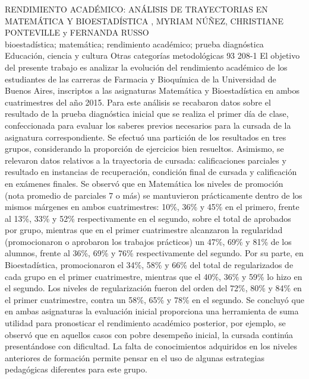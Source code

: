 \A
{RENDIMIENTO ACADÉMICO: ANÁLISIS DE TRAYECTORIAS EN MATEMÁTICA Y BIOESTADÍSTICA}
{, MYRIAM NÚÑEZ, CHRISTIANE PONTEVILLE y FERNANDA RUSSO}
{
\\}
{bioestadística; matemática; rendimiento académico; prueba diagnóstica} 
 {Educación, ciencia y cultura} 
 {Otras categorías metodológicas} 
 {93} 
 {208-1}
{El objetivo del presente trabajo es analizar la evolución del rendimiento académico de los estudiantes de las carreras de Farmacia y Bioquímica de la Universidad de Buenos Aires, inscriptos a las asignaturas Matemática y Bioestadística en ambos cuatrimestres del año 2015. Para este análisis se recabaron datos sobre el resultado de la prueba diagnóstica inicial que se realiza el primer día de clase, confeccionada para evaluar los saberes previos necesarios para la cursada de la asignatura correspondiente. Se efectuó una partición de los resultados en tres grupos, considerando la proporción de ejercicios bien resueltos. Asimismo, se relevaron datos relativos a la trayectoria de cursada: calificaciones parciales y resultado en instancias de recuperación, condición final de cursada y calificación en exámenes finales. Se observó que en Matemática los niveles de promoción (nota promedio de parciales 7 o más) se mantuvieron prácticamente dentro de los mismos márgenes en ambos cuatrimestres: 10\%, 36\% y 45\% en el primero, frente al 13\%, 33\% y 52\% respectivamente en el segundo, sobre el total de aprobados por grupo, mientras que en el primer cuatrimestre alcanzaron la regularidad (promocionaron o aprobaron los trabajos prácticos) un 47\%, 69\% y 81\% de los alumnos, frente al 36\%, 69\% y 76\% respectivamente del segundo. Por su parte, en Bioestadística, promocionaron el 34\%, 58\% y 66\% del total de regularizados de cada grupo en el primer cuatrimestre, mientras que el 40\%, 36\% y 59\% lo hizo en el segundo. Los niveles de regularización fueron del orden del 72\%, 80\% y 84\% en el primer cuatrimestre, contra un 58\%, 65\% y 78\% en el segundo. Se concluyó que en ambas asignaturas la evaluación inicial proporciona una herramienta de suma utilidad para pronosticar el rendimiento académico posterior, por ejemplo, se observó que en aquellos casos con pobre desempeño inicial, la cursada continúa presentándose con dificultad. La falta de conocimientos adquiridos en los niveles anteriores de formación permite pensar en el uso de algunas estrategias pedagógicas diferentes para este grupo. }
